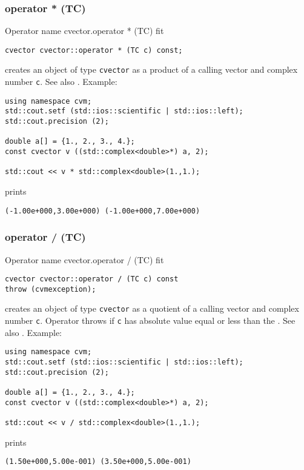 \subsubsection{operator * (TC)}
Operator%
\pdfdest name {cvector.operator * (TC)} fit
\begin{verbatim}
cvector cvector::operator * (TC c) const;
\end{verbatim}
creates an object of type \verb"cvector" as a product of
a calling  vector and  complex number \verb"c".
See also .
Example:
\begin{Verbatim}
using namespace cvm;
std::cout.setf (std::ios::scientific | std::ios::left);
std::cout.precision (2);

double a[] = {1., 2., 3., 4.};
const cvector v ((std::complex<double>*) a, 2);

std::cout << v * std::complex<double>(1.,1.);
\end{Verbatim}
prints
\begin{Verbatim}
(-1.00e+000,3.00e+000) (-1.00e+000,7.00e+000)
\end{Verbatim}
\newpage




\subsubsection{operator / (TC)}
Operator%
\pdfdest name {cvector.operator / (TC)} fit
\begin{verbatim}
cvector cvector::operator / (TC c) const
throw (cvmexception);
\end{verbatim}
creates an object of type \verb"cvector" as a quotient of
a calling  vector and  complex number \verb"c".
Operator throws
if \verb"c" has  absolute value equal or less
than the
.
See also .
Example:
\begin{Verbatim}
using namespace cvm;
std::cout.setf (std::ios::scientific | std::ios::left);
std::cout.precision (2);

double a[] = {1., 2., 3., 4.};
const cvector v ((std::complex<double>*) a, 2);

std::cout << v / std::complex<double>(1.,1.);
\end{Verbatim}
prints
\begin{Verbatim}
(1.50e+000,5.00e-001) (3.50e+000,5.00e-001)
\end{Verbatim}
\newpage



